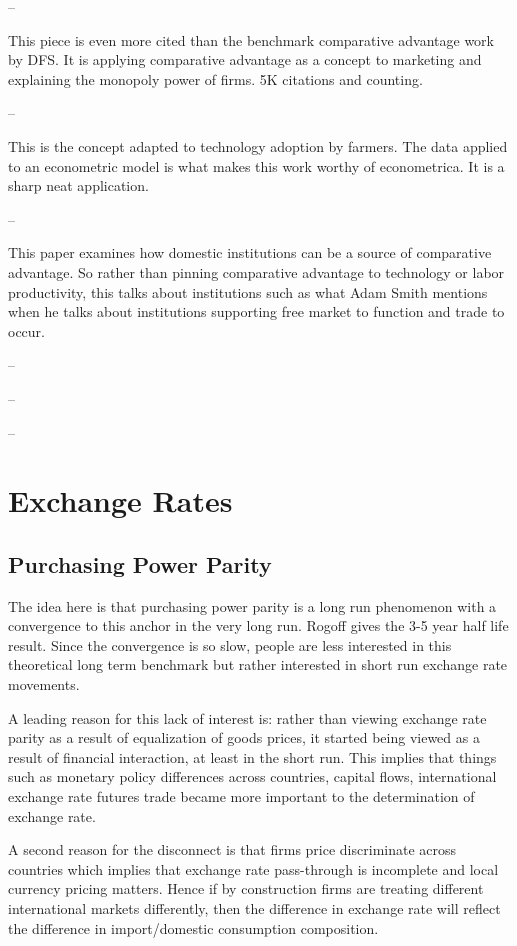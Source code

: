 \documentclass[12pt]{article}
\begin{document}
-- \cite{Hunt1995JM}

This piece is even more cited than the benchmark comparative advantage work by DFS. It is applying comparative advantage as a concept to marketing and explaining the monopoly power of firms. 5K citations and counting.

-- \cite{Suri2011E}

This is the concept adapted to technology adoption by farmers. The data applied to an econometric model is what makes this work worthy of econometrica. It is a sharp neat application.

-- \cite{Nunn2014HIE}

This paper examines how domestic institutions can be a source of comparative advantage. So rather than pinning comparative advantage to technology or labor productivity, this talks about institutions such as what Adam Smith mentions when he talks about institutions supporting free market to function and trade to occur.

-- \cite{Liu2020JDE}

-- \cite{Do2016JDE}

-- \cite{Ju2011JIE}

\section{Exchange Rates}

\subsection{Purchasing Power Parity}
The idea here is that purchasing power parity is a long run phenomenon with a convergence to this anchor in the very long run. Rogoff gives the 3-5 year half life result. Since the convergence is so slow, people are less interested in this theoretical long term benchmark but rather interested in short run exchange rate movements.

A leading reason for this lack of interest is: rather than viewing exchange rate parity as a result of equalization of goods prices, it started being viewed as a result of financial interaction, at least in the short run. This implies that things such as monetary policy differences across countries, capital flows, international exchange rate futures trade became more important to the determination of exchange rate.

A second reason for the disconnect is that firms price discriminate across countries which implies that exchange rate pass-through is incomplete and local currency pricing matters. Hence if by construction firms are treating different international markets differently, then the difference in exchange rate will reflect the difference in import/domestic consumption composition.
\end{document}
